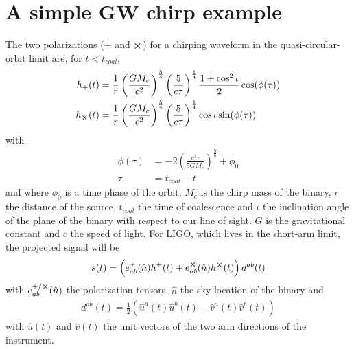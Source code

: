 \documentclass{article}
\begin{document}
\section{A simple GW chirp example}
The two polarizations ($+$ and $\cross$) for a chirping waveform in the quasi-circular-orbit limit are, for $t<t_{coal}$,
\begin{align}\label{eq:h_plus_cross}
h_+(t)&=\frac{1}{r}\left(\frac{GM_c}{c^2}\right)^{\frac{5}{4}}\left(\frac{5}{c\tau}\right)^{\frac{1}{4}}\frac{1+\cos^2\iota}{2}\cos(\phi(\tau))\nonumber\\
h_{\cross}(t)&=\frac{1}{r}\left(\frac{GM_c}{c^2}\right)^{\frac{5}{4}}\left(\frac{5}{c\tau}\right)^{\frac{1}{4}}\cos\iota\sin(\phi(\tau))
\end{align}
%
with
%
\begin{align}
\phi(\tau)&=-2\left(\frac{c^3\tau}{5GM_c}\right)^{\frac 5 8}+\phi_0\nonumber\\
\tau&=t_{coal}-t
\end{align}
and where $\phi_0$ is a time phase of the orbit, $M_c$ is the chirp mass of the binary, $r$ the distance of the source, $t_{coal}$ the time of coalescence and $\iota$ the inclination angle of the plane of the binary with respect to our line of sight. $G$ is the gravitational constant and $c$ the speed of light. For LIGO, which lives in the short-arm limit, the projected signal will be
%
\begin{align}\label{eq:proj_signal}
s(t)=\left(e^+_{ab}(\hat n)h^+(t) + e^{\cross}_{ab}(\hat n)h^{\cross}(t)\right)d^{ab}(t)
\end{align}
%
with $e_{ab}^{+/\cross}(\hat n)$ the polarization tensors, $\hat n$ the sky location of the binary and
%
\begin{align}
d^{ab}(t)=\frac{1}{2}\left(\hat u^a(t)\hat u^b(t)-\hat v^a(t)\hat v^b(t)\right)
\end{align}
%
with $\hat u(t)$ and $\hat v(t)$ the unit vectors of the two arm directions of the instrument.
\end{document}
